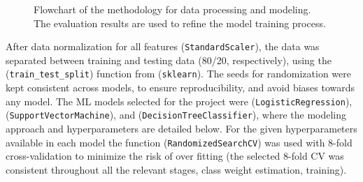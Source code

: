 \documentclass[conference]{IEEEtran}
\begin{document}
\begin{figure}[h]
\centering
{}
\caption{Flowchart of the methodology for data processing and modeling. The evaluation results are used to refine the model training process.}
\label{fig:methodology}
\end{figure}

After data normalization for all features (\texttt{StandardScaler}), the data was separated between training and testing data (80/20, respectively), using the (\texttt{train\_test\_split}) function from (\texttt{sklearn}). The seeds for randomization were kept consistent across models, to ensure reproducibility, and avoid biases towards any model. 
The ML models selected for the project were (\texttt{LogisticRegression}), (\texttt{SupportVectorMachine}), and (\texttt{DecisionTreeClassifier}), where the modeling approach and hyperparameters are detailed below. For the given hyperparameters available in each model the function (\texttt{RandomizedSearchCV}) was used with 8-fold cross-validation to minimize the risk of over fitting (the selected 8-fold CV was consistent throughout all the relevant stages, class weight estimation, training). 
\end{document}
